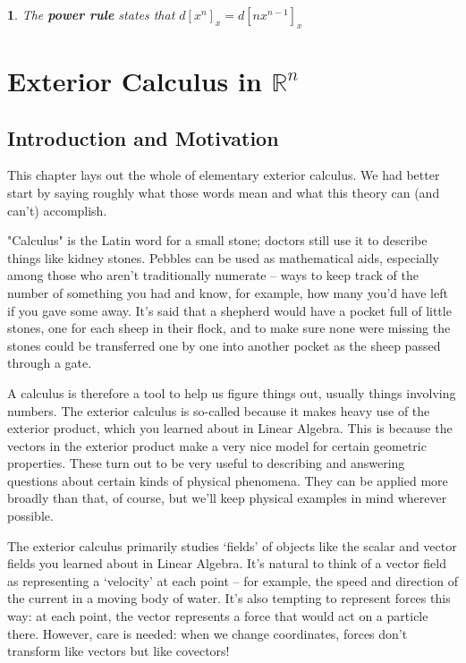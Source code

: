 \documentclass[oneside,english]{amsbook}
\numberwithin{section}{chapter}
\theoremstyle{plain}
\newtheorem{thm}{\protect\theoremname}
\theoremstyle{definition}
\providecommand{\theoremname}{Theorem}
\begin{document}
			\begin{thm}
				The \textbf{power rule} states that $d[x^n]_x = d[nx^{n-1}]_x$
			\end{thm}

	\chapter{Exterior Calculus in $\mathbb{R}^n$}
	
		\section{Introduction and Motivation}
		
			This chapter lays out the whole of elementary exterior calculus. We had better start by saying roughly what those words mean and what this theory can (and can't) accomplish.
			
			"Calculus" is the Latin word for a small stone; doctors still use it to describe things like kidney stones. Pebbles can be used as mathematical aids, especially among those who aren't traditionally numerate -- ways to keep track of the number of something you had and know, for example, how many you'd have left if you gave some away. It's said that a shepherd would have a pocket full of little stones, one for each sheep in their flock, and to make sure none were missing the stones could be transferred one by one into another pocket as the sheep passed through a gate.
			
			A calculus is therefore a tool to help us figure things out, usually things involving numbers. The exterior calculus is so-called because it makes heavy use of the exterior product, which you learned about in Linear Algebra. This is because the vectors in the exterior product make a very nice model for certain geometric properties. These turn out to be very useful to describing and answering questions about certain kinds of physical phenomena. They can be applied more broadly than that, of course, but we'll keep physical examples in mind wherever possible.
			
			The exterior calculus primarily studies `fields' of objects like the scalar and vector fields you learned about in Linear Algebra. It's natural to think of a vector field as representing a `velocity' at each point -- for example, the speed and direction of the current in a moving body of water. It's also tempting to represent forces this way: at each point, the vector represents a force that would act on a particle there. However, care is needed: when we change coordinates, forces don't transform like vectors but like covectors! 
			
\end{document}
